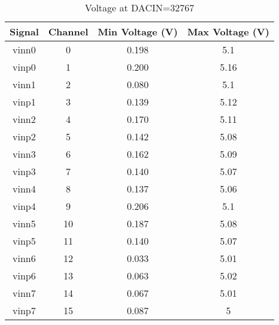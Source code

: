\begin{table}[h!]
	\centering
	\caption{Voltage at DACIN=32767}
	\begin{tabular}{ |c|c|c|c| }
		\hline
		\textbf{Signal} & \textbf{Channel} & \textbf{Min Voltage (V)} & \textbf{Max Voltage (V)} \\
		\hline
		vinn0           & 0                & 0.198                    & 5.1                      \\
		\hline
		vinp0           & 1                & 0.200                    & 5.16                     \\
		\hline
		vinn1           & 2                & 0.080                    & 5.1                      \\
		\hline
		vinp1           & 3                & 0.139                    & 5.12                     \\
		\hline
		vinn2           & 4                & 0.170                    & 5.11                     \\
		\hline
		vinp2           & 5                & 0.142                    & 5.08                     \\
		\hline
		vinn3           & 6                & 0.162                    & 5.09                     \\
		\hline
		vinp3           & 7                & 0.140                    & 5.07                     \\
		\hline
		vinn4           & 8                & 0.137                    & 5.06                     \\
		\hline
		vinp4           & 9                & 0.206                    & 5.1                      \\
		\hline
		vinn5           & 10               & 0.187                    & 5.08                     \\
		\hline
		vinp5           & 11               & 0.140                    & 5.07                     \\
		\hline
		vinn6           & 12               & 0.033                    & 5.01                     \\
		\hline
		vinp6           & 13               & 0.063                    & 5.02                     \\
		\hline
		vinn7           & 14               & 0.067                    & 5.01                     \\
		\hline
		vinp7           & 15               & 0.087                    & 5                        \\
		\hline
	\end{tabular}
\end{table}


